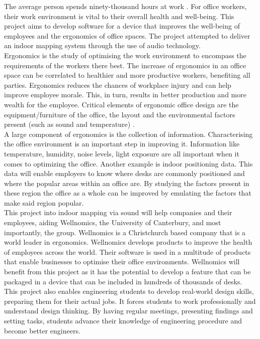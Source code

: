
The average person spends ninety-thousand hours at work \cite{90hours}. For office workers, their work environment is vital to their overall health and well-being. This project aims to develop software for a device that improves the well-being of employees and the ergonomics of office spaces. The project attempted to deliver an indoor mapping system through the use of audio technology.\\

Ergonomics is the study of optimising the work environment to encompass the requirements of the workers there best. The increase of ergonomics in an office space can be correlated to healthier and more productive workers, benefiting all parties. Ergonomics reduces the chances of workplace injury and can help improve employee morale. This, in turn, results in better production and more wealth for the employee. Critical elements of ergonomic office design are the equipment/furniture of the office, the layout and the environmental factors present (such as sound and temperature) \cite{ergonomics}.\\

A large component of ergonomics is the collection of information. Characterising the office environment is an important step in improving it. Information like temperature, humidity, noise levels, light exposure are all important when it comes to optimizing the office. Another example is indoor positioning data. This data will enable employers to know where desks are commonly positioned and where the popular areas within an office are. By studying the factors present in these region the office as a whole can be improved by emulating the factors that make said region popular. \\

This project into indoor mapping via sound will help companies and their employees, aiding Wellnomics, the University of Canterbury, and most importantly, the group. Wellnomics is a Christchurch based company that is a world leader in ergonomics. Wellnomics develops products to improve the health of employees across the world. Their software is used in a multitude of products that enable businesses to optimise their office environments. Wellnomics will benefit from this project as it has the potential to develop a feature that can be packaged in a device that can be included in hundreds of thousands of desks.\\

This project also enables engineering students to develop real-world design skills, preparing them for their actual jobs. It forces students to work professionally and understand design thinking. By having regular meetings, presenting findings and setting tasks, students advance their knowledge of engineering procedure and become better engineers.\\
\pagebreak
